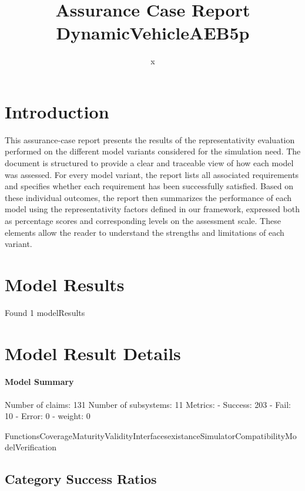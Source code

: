 \documentclass{article}
\title{Assurance Case Report DynamicVehicleAEB5p}
\author{x}
\begin{document}
	\maketitle
	\section{Introduction}
	This assurance-case report presents the results of the 
	representativity evaluation performed on the different model variants considered for 
	the simulation need. The document is structured to provide a clear and traceable view of how 
	each model was assessed. For every model variant, the report lists all associated requirements
	 and specifies whether each requirement has been successfully satisfied. Based on these 
	individual outcomes, the report then summarizes the performance of each model using the 
	representativity factors defined in our framework, expressed both as percentage scores 
	and corresponding levels on the assessment scale. These elements allow the reader to understand 
	the strengths and limitations of each variant.
	 
	\section{Model Results}
    Found 1 modelResults
		
			\section{Model Result Details} 
			\paragraph{Model Summary}
			Number of claims: 131
			Number of subsystems: 11
			Metrics:
			- Success: 203
			- Fail: 10
			- Error: 0
			- weight: 0
			
			FunctionsCoverageMaturityValidityInterfacesexistanceSimulatorCompatibilityModelVerification

					\subsection{Category Success Ratios}
						
\end{document}
